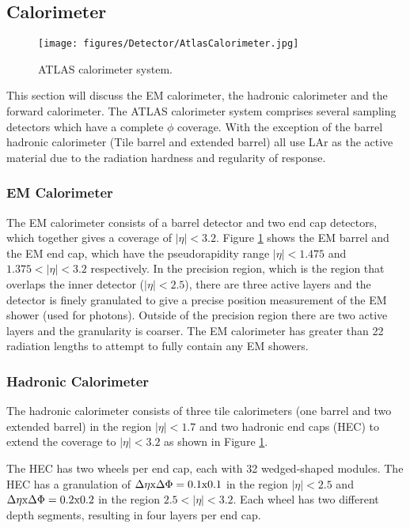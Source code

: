 \subsection{Calorimeter}
\label{sec:Det:Cal}

\begin{figure}
  \centering
  \texttt{[image: figures/Detector/AtlasCalorimeter.jpg]}
  \caption{ATLAS calorimeter system.}
\label{Det:ATLASCalo}
\end{figure}

This section will discuss the EM calorimeter, the hadronic calorimeter and the forward calorimeter. 
The ATLAS calorimeter system comprises several sampling detectors which have a complete $\phi$ coverage.
With the exception of the barrel hadronic calorimeter (Tile barrel and extended barrel) all use LAr as the active material due to the radiation hardness and regularity of response.

\subsubsection{EM Calorimeter}

The EM calorimeter consists of a barrel detector and two end cap detectors, which together gives a coverage of $|\eta|<3.2$.
Figure \ref{Det:ATLASCalo} shows the EM barrel and the EM end cap, which have the pseudorapidity range $|\eta|<1.475$ and $1.375<|\eta|<3.2$ respectively.
In the precision region,  which is the region that overlaps the inner detector ($|\eta|<2.5$), there are three active layers and the detector is finely granulated to give a precise position measurement of the EM shower (used for photons).
Outside of the precision region there are two active layers and the granularity is coarser. 
The EM calorimeter has greater than 22 radiation lengths to attempt to fully contain any EM showers.


\subsubsection{Hadronic Calorimeter}

The hadronic calorimeter consists of three tile calorimeters (one barrel and two extended barrel) in the region $|\eta|<1.7$ and two hadronic end caps (HEC) to extend the coverage to $|\eta|<3.2$ as shown in Figure \ref{Det:ATLASCalo}.  

The HEC has two wheels per end cap, each with 32 wedged-shaped modules. 
The HEC has a granulation of $\Delta\eta \rm{x} \Delta\Phi = 0.1\rm{x}0.1$ in the region $|\eta|<2.5$ and $\Delta\eta \rm{x} \Delta\Phi = 0.2\rm{x}0.2$ in the region $2.5<|\eta|<3.2$. 
Each wheel has two different depth segments, resulting in four layers per end cap.


